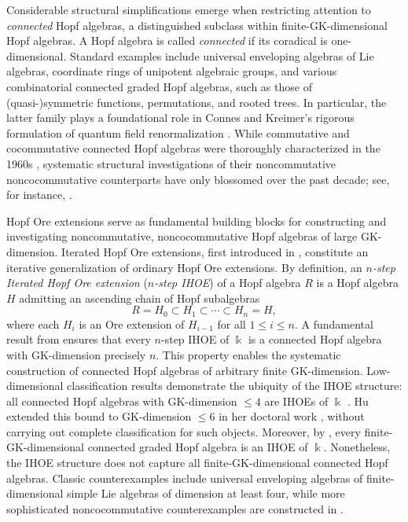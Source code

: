 \documentclass{article}
\theoremstyle{plain}
\theoremstyle{definition}
\numberwithin{equation}{section}
\begin{document}
	Considerable structural simplifications emerge when restricting attention to \emph{connected} Hopf algebras, a distinguished subclass within finite-GK-dimensional Hopf algebras. A Hopf algebra is called \emph{connected} if its coradical is one-dimensional. Standard examples include universal enveloping algebras of Lie algebras, coordinate rings of unipotent algebraic groups, and various combinatorial connected graded Hopf algebras, such as those of (quasi-)symmetric functions, permutations, and rooted trees. In particular, the latter family plays a foundational role in Connes and Kreimer’s rigorous formulation of quantum field renormalization \cite{CK98}. While commutative and cocommutative connected Hopf algebras were thoroughly characterized in the 1960s \cite{MM65,CP21}, systematic structural investigations of their noncommutative noncocommutative counterparts have only blossomed over the past decade; see, for instance, \cite{Zh13,WZZ15,Wa15,BOZZ15,BG16,BGZ19,ZSL20,BZ22,Zh24,HW26}.
	
	Hopf Ore extensions serve as fundamental building blocks for constructing and investigating noncommutative, noncocommutative Hopf algebras of large GK-dimension. Iterated Hopf Ore extensions, first introduced in \cite{BOZZ15}, constitute an iterative generalization of ordinary Hopf Ore extensions. By definition, an \emph{$n$-step Iterated Hopf Ore extension} (\emph{$n$-step IHOE}) of a Hopf algebra $R$ is a Hopf algebra $H$ admitting an ascending chain of Hopf subalgebras 
	\[
	R=H_{0} \subset H_{1} \subset \cdots \subset H_{n}=H,
	\]
	where each $H_i$ is an Ore extension of $H_{i-1}$ for all $1\le i\le n$. A fundamental result from \cite[Theorem 3.2]{BOZZ15} ensures that every $n$-step IHOE of $\Bbbk$ is a connected Hopf algebra with GK-dimension precisely $n$. This property enables the systematic construction of connected Hopf algebras of arbitrary finite GK-dimension. Low-dimensional classification results demonstrate the ubiquity of the IHOE structure: all connected Hopf algebras with GK-dimension $\le 4$ are IHOEs of $\Bbbk$ \cite{Zh13,WZZ15}. Hu extended this bound to GK-dimension $\le 6$ in her doctoral work \cite{Hu26},  without carrying out complete classification for such objects. Moreover, by \cite[Theorem B]{ZSL20}, every finite-GK-dimensional connected graded Hopf algebra is an IHOE of $\Bbbk$. Nonetheless, the IHOE structure does not capture all finite-GK-dimensional connected Hopf algebras. Classic counterexamples include universal enveloping algebras of finite-dimensional simple Lie algebras of dimension at least four, while more sophisticated noncocommutative counterexamples are constructed in \cite{HW26}.
	
\end{document}
